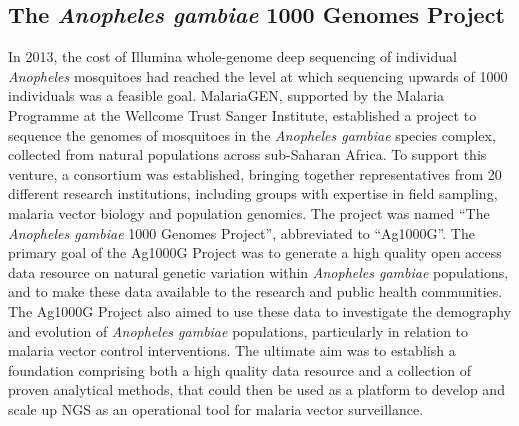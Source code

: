 \begin{refsection}
\section{The \textit{Anopheles gambiae} 1000 Genomes Project}\label{sec:ag1000g}


In 2013, the cost of Illumina whole-genome deep sequencing of individual \textit{Anopheles} mosquitoes had reached the level at which sequencing upwards of 1000 individuals was a feasible goal.
%
MalariaGEN, supported by the Malaria Programme at the Wellcome Trust Sanger Institute, established a project to sequence the genomes of mosquitoes in the \textit{Anopheles gambiae} species complex, collected from natural populations across sub-Saharan Africa.
%
To support this venture, a consortium was established, bringing together representatives from 20 different research institutions, including groups with expertise in field sampling, malaria vector biology and population genomics.
%
The project was named ``The \textit{Anopheles gambiae} 1000 Genomes Project'', abbreviated to ``Ag1000G''.
%
The primary goal of the Ag1000G Project was to generate a high quality open access data resource on natural genetic variation within \textit{Anopheles gambiae} populations, and to make these data available to the research and public health communities.
%
The Ag1000G Project also aimed to use these data to investigate the demography and evolution of \textit{Anopheles gambiae} populations, particularly in relation to malaria vector control interventions.
%
The ultimate aim was to establish a foundation comprising both a high quality data resource and a collection of proven analytical methods, that could then be used as a platform to develop and scale up NGS as an operational tool for malaria vector surveillance.
%


\end{refsection}
